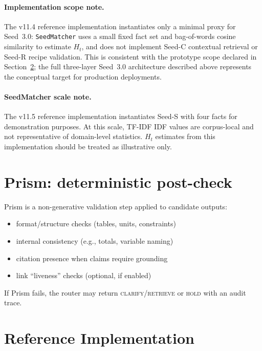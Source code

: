 \documentclass[11pt,a4paper]{article}
\begin{document}
\paragraph{Implementation scope note.}
The v11.4 reference implementation instantiates only a minimal proxy for Seed~3.0:
\texttt{SeedMatcher} uses a small fixed fact set and bag-of-words cosine similarity
to estimate $H_t$, and does not implement Seed-C contextual retrieval or Seed-R
recipe validation.
This is consistent with the prototype scope declared in Section~\ref{sec:impl};
the full three-layer Seed~3.0 architecture described above represents the
conceptual target for production deployments.

\paragraph{SeedMatcher scale note.}
The v11.5 reference implementation instantiates Seed-S with four facts for
demonstration purposes. At this scale, TF-IDF IDF values are corpus-local and not
representative of domain-level statistics. $H_t$ estimates from this implementation
should be treated as illustrative only.

\section{Prism: deterministic post-check}
\label{sec:prism}

Prism is a non-generative validation step applied to candidate outputs:
\begin{itemize}
\item format/structure checks (tables, units, constraints)
\item internal consistency (e.g., totals, variable naming)
\item citation presence when claims require grounding
\item link ``liveness'' checks (optional, if enabled)
\end{itemize}
If Prism fails, the router may return \textsc{clarify}/\textsc{retrieve} or
\textsc{hold} with an audit trace.

\section{Reference Implementation}
\label{sec:impl}
\end{document}
